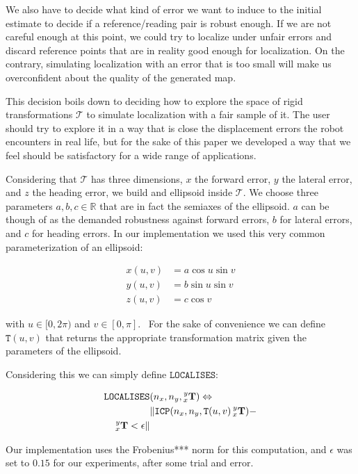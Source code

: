 \documentclass[letterpaper,10 pt,conference]{ieeeconf}
\newcommand{\mat}[1]{\mathbf{#1}}
\begin{document}
We also have to decide what kind of error we want to induce to the initial
estimate to decide if a reference/reading pair is robust enough. 
If we are not careful enough at this point, we could try to localize under
unfair errors and discard reference points that are in reality good enough for
localization.
On the contrary, simulating localization with an error that is too small will
make us overconfident about the quality of the generated map.

This decision boils down to deciding how to explore the space of rigid
transformations $\mathcal{T}$ to simulate localization with a fair sample of it.
The user should try to explore it in a way that is close the displacement errors
the robot encounters in real life, but for the sake of this paper we developed a
way that we feel should be satisfactory for a wide range of applications.

Considering that $\mathcal{T}$ has three dimensions, $x$ the forward error, $y$
the lateral error, and $z$ the heading error, we build and ellipsoid inside
$\mathcal{T}$.
We choose three parameters $a, b, c \in \mathbb{R}$ that are in fact the
semiaxes of the ellipsoid. $a$ can be though of as the demanded robustness
against forward errors, $b$ for lateral errors, and $c$ for heading errors.
In our implementation we used this very common parameterization of an ellipsoid:

\begin{align*}
x(u,v) &= a \cos u \sin v \\
y(u,v) &= b \sin u \sin v \\
z(u,v) &= c \cos v
\end{align*}

with $u \in [0,2\pi)$ and $v \in [0,\pi]$. \
For the sake of convenience we can define $\texttt{T}(u,v)$ that returns the
appropriate transformation matrix given the parameters of the ellipsoid.

Considering this we can simply define $\texttt{LOCALISES}$:

\begin{align}
\texttt{LOCALISES}&(n_x, n_y, \prescript{y}{x}{ \mat{T} }) \Leftrightarrow  \\
&\| \texttt{ICP}(n_x, n_y, \texttt{T}(u,v) \prescript{y}{x}{\mat{T}}) - \\ 
\prescript{y}{x}{ \mat{T} } < \epsilon \|
\end{align}

Our implementation uses the Frobenius*** norm for this computation, and $\epsilon$
was set to $0.15$ for our experiments, after some trial and error.
\end{document}
